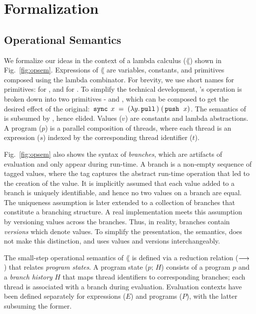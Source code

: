 \section{Formalization}
\label{sec:formalization}

\subsection{Operational Semantics}
\label{sec:opsem}

We formalize our ideas in the context of a lambda calculus ($\lang$)
shown in Fig.~\ref{fig:opsem}. Expressions of $\lang$ are variables,
constants, and \name primitives composed using the lambda combinator.
For brevity, we use short names for \name primitives:  for
, and  for . To
simplify the technical development, \name's 
operation is broken down into two primitives -  and ,
which can be composed to get the desired effect of the original:
$\,{\tt sync}\,\;x \;=\; (\lambda y.\,{\tt pull}\,)\; (\,{\tt push}\,\;\,x)$.  The semantics
of is subsumed by , hence elided.
Values ($v$) are constants and lambda abstractions.  A program ($p$)
is a parallel composition of threads, where each thread is an
expression ($s$) indexed by the corresponding thread identifier ($t$).



Fig.~\ref{fig:opsem} also shows the syntax of \emph{branches}, which
are artifacts of evaluation and only appear during run-time. A branch
is a non-empty sequence of tagged values, where the tag captures the
abstract run-time operation that led to the creation of the value. It
is implicitly assumed that each value added to a branch is uniquely
identifiable, and hence no two values on a branch are equal.  The
uniqueness assumption is later extended to a collection of branches
that constitute a branching structure. A real implementation meets
this assumption by versioning values across the branches. Thus, in
reality, branches contain \emph{versions} which denote values.  To
simplify the presentation, the semantics, does not make this
distinction, and uses values and versions interchangeably.

The small-step operational semantics of $\lang$ is defined via a
reduction relation ($\longrightarrow$) that relates \emph{program states}. A
program state ($p;\,H$) consists of a program $p$ and a \emph{branch
  history} $H$ that maps thread identifiers to corresponding branches;
each thread is associated with a branch during evaluation. Evaluation
contexts have been defined separately for expressions ($E$) and
programs ($P$), with the latter subsuming the former.

